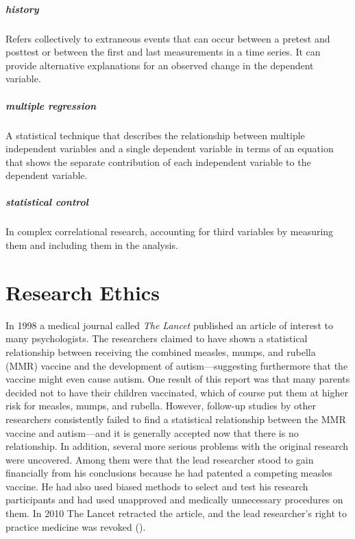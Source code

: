 \documentclass[
]{krantz}
\begin{document}
\paragraph*{history}\label{history}

Refers collectively to extraneous events that can occur between a pretest and posttest or between the first and last measurements in a time series. It can provide alternative explanations for an observed change in the dependent variable.

\paragraph*{multiple regression}\label{multiple-regression}

A statistical technique that describes the relationship between multiple independent variables and a single dependent variable in terms of an equation that shows the separate contribution of each independent variable to the dependent variable.

\paragraph*{statistical control}\label{statistical-control}

In complex correlational research, accounting for third variables by measuring them and including them in the analysis.

\chapter{Research Ethics}\label{research-ethics}

In 1998 a medical journal called \emph{The Lancet} published an article of interest to many psychologists. The researchers claimed to have shown a statistical relationship between receiving the combined measles, mumps, and rubella (MMR) vaccine and the development of autism---suggesting furthermore that the vaccine might even cause autism. One result of this report was that many parents decided not to have their children vaccinated, which of course put them at higher risk for measles, mumps, and rubella. However, follow-up studies by other researchers consistently failed to find a statistical relationship between the MMR vaccine and autism---and it is generally accepted now that there is no relationship. In addition, several more serious problems with the original research were uncovered. Among them were that the lead researcher stood to gain financially from his conclusions because he had patented a competing measles vaccine. He had also used biased methods to select and test his research participants and had used unapproved and medically unnecessary procedures on them. In 2010 The Lancet retracted the article, and the lead researcher's right to practice medicine was revoked ().
\end{document}
